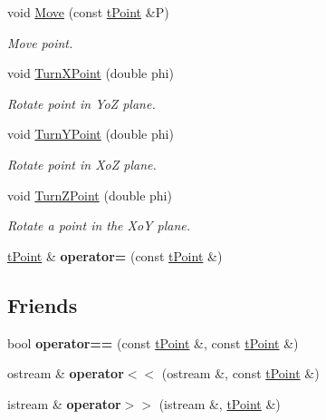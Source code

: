 \begin{DoxyCompactItemize}
\mbox{\label{classtPoint_ab85d062451a895276bcd60bdba888768}} 
void \hyperlink{classtPoint_ab85d062451a895276bcd60bdba888768}{Move} (const \hyperlink{classtPoint}{t\+Point} \&P)
\begin{DoxyCompactList}\small\item\em Move point. \end{DoxyCompactList}\item 
\mbox{\label{classtPoint_a13e8f123791c52d15a9fc631ac47a7fe}} 
void \hyperlink{classtPoint_a13e8f123791c52d15a9fc631ac47a7fe}{Turn\+X\+Point} (double phi)
\begin{DoxyCompactList}\small\item\em Rotate point in YoZ plane. \end{DoxyCompactList}\item 
\mbox{\label{classtPoint_a7509d78eadd35f4e48da991927bab368}} 
void \hyperlink{classtPoint_a7509d78eadd35f4e48da991927bab368}{Turn\+Y\+Point} (double phi)
\begin{DoxyCompactList}\small\item\em Rotate point in XoZ plane. \end{DoxyCompactList}\item 
\mbox{\label{classtPoint_aea130545fd9a4a137901c483d2b9570f}} 
void \hyperlink{classtPoint_aea130545fd9a4a137901c483d2b9570f}{Turn\+Z\+Point} (double phi)
\begin{DoxyCompactList}\small\item\em Rotate a point in the XoY plane. \end{DoxyCompactList}\item 
\mbox{\label{classtPoint_a01916af640294762c1946f10c03b06ec}} 
\hyperlink{classtPoint}{t\+Point} \& {\bfseries operator=} (const \hyperlink{classtPoint}{t\+Point} \&)
\end{DoxyCompactItemize}
\subsection*{Friends}
\begin{DoxyCompactItemize}
\item 
\mbox{\label{classtPoint_a596f2f80bfe55efa7074306033e5656c}} 
bool {\bfseries operator==} (const \hyperlink{classtPoint}{t\+Point} \&, const \hyperlink{classtPoint}{t\+Point} \&)
\item 
\mbox{\label{classtPoint_aca0717ecb2dfcd55c8b0a6eb56c6c16b}} 
ostream \& {\bfseries operator$<$$<$} (ostream \&, const \hyperlink{classtPoint}{t\+Point} \&)
\item 
\mbox{\label{classtPoint_a21e934e5bfe986e0b39885970a361047}} 
istream \& {\bfseries operator$>$$>$} (istream \&, \hyperlink{classtPoint}{t\+Point} \&)
\end{DoxyCompactItemize}


